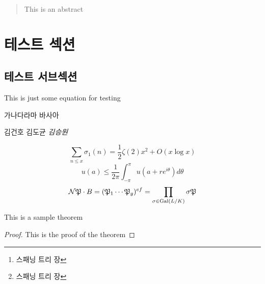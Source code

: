 \documentclass[]{sptr_article}
\author{김승원 \and 최우진\and 김도균\thanks{ 스패닝 트리 장 } \and 김건호\thanks{ 스패닝 트리 장}}
\date{}
\begin{document}
\maketitle


\begin{abstract}
	This is an abstract
\end{abstract}

\tableofcontents

\section{테스트 섹션}

\subsection{테스트 서브섹션}

This is just some equation for testing

가나다라마 바사아

김건호 김도균
\textit{김승원}

\begin{equation}
	\sum_{n \leq x} \sigma_1 (n) = \frac{1}{2} \zeta(2) x^2 + O(x \log x)
\end{equation}
\begin{equation}
	u(a) \leq \frac{1}{2\pi} \int_{-\pi}^\pi u(a + r e^{i \theta}) d\theta
\end{equation}
\begin{equation}
	\mathcal{N} \mathfrak{P} \cdot B = (\mathfrak{P}_1 \cdots \mathfrak{P}_g)^{ef} = \prod_{\sigma \in \operatorname{Gal}(L/K)} \sigma \mathfrak{P}
\end{equation}

\begin{theorem}
	This is a sample theorem
\end{theorem}

\begin{proof}
	This is the proof of the theorem
\end{proof}

\lipsum
\end{document}
